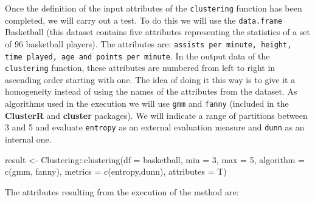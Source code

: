 \documentclass[
]{article}
\newenvironment{Shaded}{\begin{snugshade}}{\end{snugshade}}
\newcommand{\AttributeTok}[1]{\textcolor[rgb]{0.77,0.63,0.00}{#1}}
\newcommand{\DecValTok}[1]{\textcolor[rgb]{0.00,0.00,0.81}{#1}}
\newcommand{\FunctionTok}[1]{\textcolor[rgb]{0.00,0.00,0.00}{#1}}
\newcommand{\NormalTok}[1]{#1}
\newcommand{\OtherTok}[1]{\textcolor[rgb]{0.56,0.35,0.01}{#1}}
\newcommand{\SpecialCharTok}[1]{\textcolor[rgb]{0.00,0.00,0.00}{#1}}
\newcommand{\StringTok}[1]{\textcolor[rgb]{0.31,0.60,0.02}{#1}}
\begin{document}
Once the definition of the input attributes of the \texttt{clustering}
function has been completed, we will carry out a test. To do this we
will use the \texttt{data.frame} Basketball (this dataset contains five
attributes representing the statistics of a set of 96 basketball
players). The attributes are:
\texttt{assists per minute, height, time played, age and points per minute}.
In the output data of the \texttt{clustering} function, these attributes
are numbered from left to right in ascending order starting with one.
The idea of doing it this way is to give it a homogeneity instead of
using the names of the attributes from the dataset. As algorithms used
in the execution we will use \texttt{gmm} and \texttt{fanny} (included
in the \textbf{ClusterR} and \textbf{cluster} packages). We will
indicate a range of partitions between 3 and 5 and evaluate
\texttt{entropy} as an external evaluation measure and \texttt{dunn} as
an internal one.

\begin{Shaded}
\begin{Highlighting}[]
\NormalTok{result }\OtherTok{\textless{}{-}}\NormalTok{ Clustering}\SpecialCharTok{::}\FunctionTok{clustering}\NormalTok{(}\AttributeTok{df =}\NormalTok{ basketball, }\AttributeTok{min =} \DecValTok{3}\NormalTok{, }\AttributeTok{max =} \DecValTok{5}\NormalTok{, }\AttributeTok{algorithm =} \FunctionTok{c}\NormalTok{(}\StringTok{\textquotesingle{}gmm\textquotesingle{}}\NormalTok{,}
                        \StringTok{\textquotesingle{}fanny\textquotesingle{}}\NormalTok{), }\AttributeTok{metrics =} \FunctionTok{c}\NormalTok{(}\StringTok{\textquotesingle{}entropy\textquotesingle{}}\NormalTok{,}\StringTok{\textquotesingle{}dunn\textquotesingle{}}\NormalTok{), }\AttributeTok{attributes =}\NormalTok{ T)}
\end{Highlighting}
\end{Shaded}

The attributes resulting from the execution of the method are:
\end{document}
